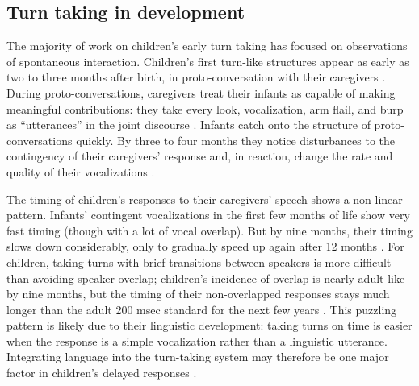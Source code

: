 \documentclass[authoryear, 12pt]{elsarticle}
\begin{document}
\subsection{Turn taking in development}


The majority of work on children's early turn taking has focused on observations of spontaneous interaction. Children's first turn-like structures appear as early as two to three months after birth, in proto-conversation with their caregivers \citep{bruner1975, bruner1985}. During proto-conversations, caregivers treat their infants as capable of making meaningful contributions: they take every look, vocalization, arm flail, and burp as ``utterances'' in the joint discourse \citep{bateson1975, jaffe2001, snow1977}. Infants catch onto the structure of proto-conversations quickly. By three to four months they notice disturbances to the contingency of their caregivers' response and, in reaction, change the rate and quality of their vocalizations \citep{k-bloom1988, masataka1993, toda1993}. 


The timing of children's responses to their caregivers' speech shows a non-linear pattern. Infants' contingent vocalizations in the first few months of life show very fast timing (though with a lot of vocal overlap). But by nine months, their timing slows down considerably, only to gradually speed up again after 12 months \citep{hilbrink2015}. For children, taking turns with brief transitions between speakers is more difficult than avoiding speaker overlap; children's incidence of overlap is nearly adult-like by nine months, but the timing of their non-overlapped responses stays much longer than the adult 200 msec standard for the next few years \citep{casillas2016, garvey1984, garvey1981, ervin-tripp1979}. This puzzling pattern is likely due to their linguistic development: taking turns on time is easier when the response is a simple vocalization rather than a linguistic utterance. Integrating language into the turn-taking system may therefore be one major factor in children's delayed responses \citep{casillas2016}.
\end{document}
